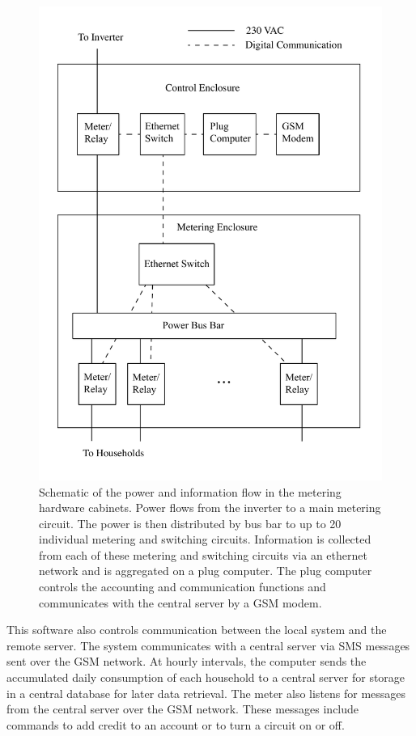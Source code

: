 \documentclass{sig-alternate}
\begin{document}
\begin{figure}[]
\begin{center}
\includegraphics[width=\columnwidth]{figures/Enclosure.pdf}
\end{center}
\caption{Schematic of the power and information flow in the metering hardware cabinets.
Power flows from the inverter to a main metering circuit.  The power is then distributed
by bus bar to up to 20 individual metering and switching circuits.  Information is collected
from each of these metering and switching circuits via an ethernet network and is aggregated
on a plug computer.  The plug computer controls the accounting and communication functions
and communicates with the central server by a GSM modem.}
\label{Enclosure}
\end{figure}


This software also controls communication between the local system and
the remote server.
The system communicates with a central server via SMS messages sent over
the GSM network.
At hourly intervals, the computer sends the accumulated daily
consumption of each household to a central server for storage in a
central database for later data retrieval.
The meter also listens for messages from the central server over the GSM network.
These messages include commands to add credit to an account or to turn
a circuit on or off.
\end{document}
